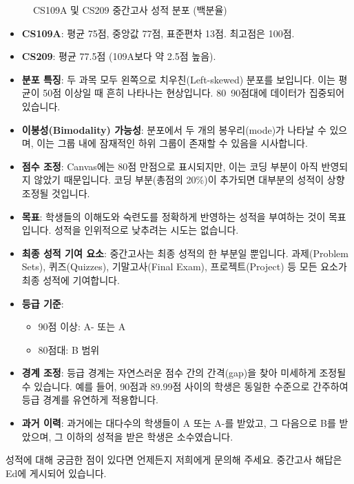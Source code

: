 \documentclass[11pt,a4paper]{article}
\theoremstyle{definition}
\begin{document}
\begin{figure}[h!]
    \centering
    \caption{CS109A 및 CS209 중간고사 성적 분포 (백분율)}
    \label{fig:midterm_grades}
\end{figure}

\begin{infobox}[title=중간고사 성적 요약]
\begin{itemize}
    \item \textbf{CS109A}: 평균 75점, 중앙값 77점, 표준편차 13점. 최고점은 100점.
    \item \textbf{CS209}: 평균 77.5점 (109A보다 약 2.5점 높음).
    \item \textbf{분포 특징}: 두 과목 모두 왼쪽으로 치우친(Left-skewed) 분포를 보입니다. 이는 평균이 50점 이상일 때 흔히 나타나는 현상입니다. 80~90점대에 데이터가 집중되어 있습니다.
    \item \textbf{이봉성(Bimodality) 가능성}: 분포에서 두 개의 봉우리(mode)가 나타날 수 있으며, 이는 그룹 내에 잠재적인 하위 그룹이 존재할 수 있음을 시사합니다.
    \item \textbf{점수 조정}: Canvas에는 80점 만점으로 표시되지만, 이는 코딩 부분이 아직 반영되지 않았기 때문입니다. 코딩 부분(총점의 20\%)이 추가되면 대부분의 성적이 상향 조정될 것입니다.
\end{itemize}
\end{infobox}

\begin{infobox}[title=성적 평가 철학]
\begin{itemize}
    \item \textbf{목표}: 학생들의 이해도와 숙련도를 정확하게 반영하는 성적을 부여하는 것이 목표입니다. 성적을 인위적으로 낮추려는 시도는 없습니다.
    \item \textbf{최종 성적 기여 요소}: 중간고사는 최종 성적의 한 부분일 뿐입니다. 과제(Problem Sets), 퀴즈(Quizzes), 기말고사(Final Exam), 프로젝트(Project) 등 모든 요소가 최종 성적에 기여합니다.
    \item \textbf{등급 기준}:
    \begin{itemize}
        \item 90점 이상: A- 또는 A
        \item 80점대: B 범위
    \end{itemize}
    \item \textbf{경계 조정}: 등급 경계는 자연스러운 점수 간의 간격(gap)을 찾아 미세하게 조정될 수 있습니다. 예를 들어, 90점과 89.99점 사이의 학생은 동일한 수준으로 간주하여 등급 경계를 유연하게 적용합니다.
    \item \textbf{과거 이력}: 과거에는 대다수의 학생들이 A 또는 A-를 받았고, 그 다음으로 B를 받았으며, 그 이하의 성적을 받은 학생은 소수였습니다.
\end{itemize}
성적에 대해 궁금한 점이 있다면 언제든지 저희에게 문의해 주세요. 중간고사 해답은 Ed에 게시되어 있습니다.
\end{infobox}
\end{document}
